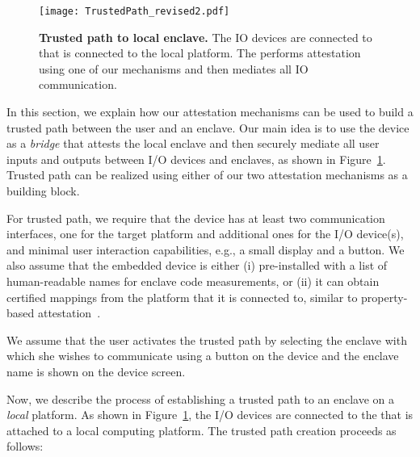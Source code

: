 \begin{figure}[t]
 \centering
 \texttt{[image: TrustedPath\_revised2.pdf]}
 \caption{\textbf{Trusted path to local enclave.} The IO devices are connected to \device that is connected to the local platform. The \device performs attestation using one of our mechanisms and then mediates all IO communication.}
 \figsaver
 \label{fig:secureInput}
\end{figure}

In this section, we explain how our attestation mechanisms can be used to build a trusted path between the user and an enclave. Our main idea is to use the \device device as a \emph{bridge} that attests the local enclave and then securely mediate all user inputs and outputs between I/O devices and enclaves, as shown in Figure~\ref{fig:secureInput}. Trusted path can be realized using either of our two attestation mechanisms as a building block.

For trusted path, we require that the \device device has at least two communication interfaces, one for the target platform and additional ones for the I/O device(s), and minimal user interaction capabilities, e.g., a small display and a button. We also assume that the embedded device is either (i) pre-installed with a list of human-readable names for enclave code measurements, or (ii) it can obtain certified mappings from the platform that it is connected to, similar to property-based attestation~\cite{SadeghiProperty}.

We assume that the user activates the trusted path by selecting the enclave with which she wishes to communicate using a button on the device and the enclave name is shown on the device screen.%




 Now, we describe the process of establishing a trusted path to an enclave on a \emph{local} platform. As shown in Figure~\ref{fig:secureInput}, the I/O devices are connected to the \device that is attached to a local computing platform. The trusted path creation proceeds as follows:

